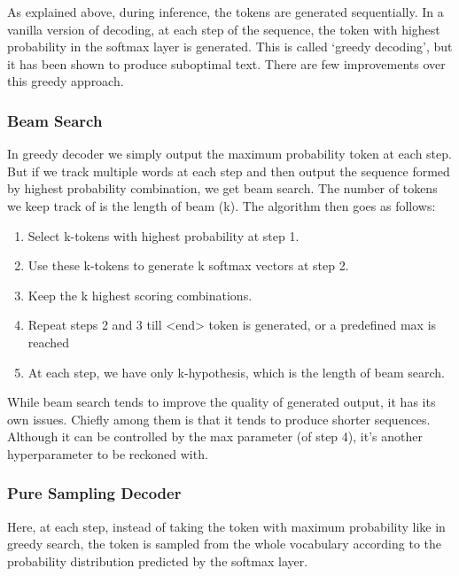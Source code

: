 \documentclass[]{krantz}
\providecommand{\tightlist}{%
  \setlength{\itemsep}{0pt}\setlength{\parskip}{0pt}}
\begin{document}
As explained above, during inference, the tokens are generated sequentially. In a vanilla version of decoding, at each step of the sequence, the token with highest probability in the softmax layer is generated. This is called `greedy decoding', but it has been shown to produce suboptimal text. There are few improvements over this greedy approach.

\hypertarget{beam-search}{%
\subsubsection{Beam Search}\label{beam-search}}

In greedy decoder we simply output the maximum probability token at each step. But if we track multiple words at each step and then output the sequence formed by highest probability combination, we get beam search. The number of tokens we keep track of is the length of beam (k). The algorithm then goes as follows:

\begin{enumerate}
\def\labelenumi{\arabic{enumi}.}
\tightlist
\item
  Select k-tokens with highest probability at step 1.
\item
  Use these k-tokens to generate k softmax vectors at step 2.
\item
  Keep the k highest scoring combinations.
\item
  Repeat steps 2 and 3 till \textless{}end\textgreater{} token is generated, or a predefined max is reached
\item
  At each step, we have only k-hypothesis, which is the length of beam search.
\end{enumerate}

While beam search tends to improve the quality of generated output, it has its own issues. Chiefly among them is that it tends to produce shorter sequences. Although it can be controlled by the max parameter (of step 4), it's another hyperparameter to be reckoned with.

\hypertarget{pure-sampling-decoder}{%
\subsubsection{Pure Sampling Decoder}\label{pure-sampling-decoder}}

Here, at each step, instead of taking the token with maximum probability like in greedy search, the token is sampled from the whole vocabulary according to the probability distribution predicted by the softmax layer.
\end{document}
